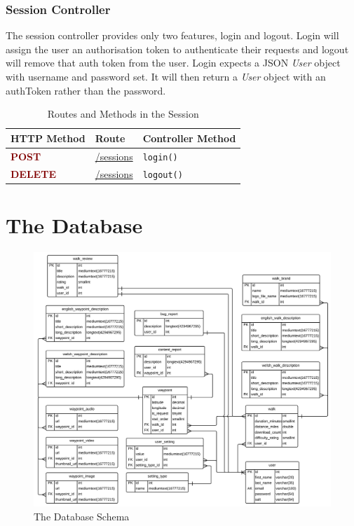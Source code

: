 \documentclass[11pt,a4paper]{report}
\begin{document}
\subsubsection{Session Controller}

The session controller provides only two features, login and logout. Login will assign the user an authorisation token to authenticate their requests and logout will remove that auth token from the user. Login expects a JSON \emph{User} object with username and password set. It will then return a \emph{User} object with an authToken rather than the password. 

\begin{table}[H]
\centering
\begin{tabular}{l | l | l}
HTTP Method & Route & Controller Method\\ \hline
\textbf{\textcolor{Maroon}{POST}} & \url{/sessions} & \lstinline$login()$\\
\textbf{\textcolor{Maroon}{DELETE}} & \url{/sessions} & \lstinline$logout()$\\
\end{tabular}
\caption{Routes and Methods in the Session}
\label{tab:SessionController}
\end{table}


\section{The Database}
\label{sec:database-design}

\begin{figure}[H]
    \centering
    \includegraphics[width=\textwidth]{ERGroup}
    \caption{The Database Schema}
    \label{fig:databaseschema}
\end{figure}
\end{document}
